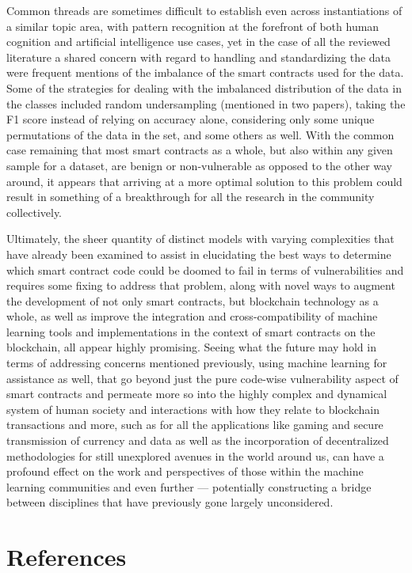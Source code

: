 \documentclass[
  11pt,
]{article}
\begin{document}
Common threads are sometimes difficult to establish even across
instantiations of a similar topic area, with pattern recognition at the
forefront of both human cognition and artificial intelligence use cases,
yet in the case of all the reviewed literature a shared concern with
regard to handling and standardizing the data were frequent mentions of
the imbalance of the smart contracts used for the data. Some of the
strategies for dealing with the imbalanced distribution of the data in
the classes included random undersampling (mentioned in two papers),
taking the F1 score instead of relying on accuracy alone, considering
only some unique permutations of the data in the set, and some others as
well. With the common case remaining that most smart contracts as a
whole, but also within any given sample for a dataset, are benign or
non-vulnerable as opposed to the other way around, it appears that
arriving at a more optimal solution to this problem could result in
something of a breakthrough for all the research in the community
collectively.

Ultimately, the sheer quantity of distinct models with varying
complexities that have already been examined to assist in elucidating
the best ways to determine which smart contract code could be doomed to
fail in terms of vulnerabilities and requires some fixing to address
that problem, along with novel ways to augment the development of not
only smart contracts, but blockchain technology as a whole, as well as
improve the integration and cross-compatibility of machine learning
tools and implementations in the context of smart contracts on the
blockchain, all appear highly promising. Seeing what the future may hold
in terms of addressing concerns mentioned previously, using machine
learning for assistance as well, that go beyond just the pure code-wise
vulnerability aspect of smart contracts and permeate more so into the
highly complex and dynamical system of human society and interactions
with how they relate to blockchain transactions and more, such as for
all the applications like gaming and secure transmission of currency and
data as well as the incorporation of decentralized methodologies for
still unexplored avenues in the world around us, can have a profound
effect on the work and perspectives of those within the machine learning
communities and even further --- potentially constructing a bridge
between disciplines that have previously gone largely unconsidered.

\newpage

\hypertarget{references}{%
\section*{References}\label{references}}
\end{document}
